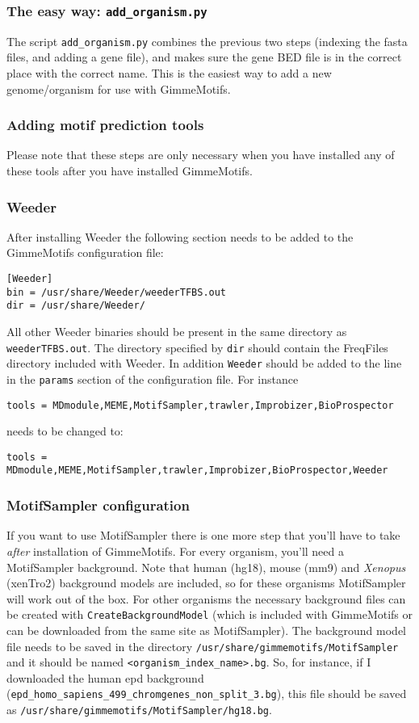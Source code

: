 \documentclass[11pt]{article}
\begin{document}
\subsubsection{The easy way: \texttt{add\_organism.py}}
The script \texttt{add\_organism.py} combines the previous two steps (indexing the fasta files, and adding a gene file), and makes sure the gene BED file is in the correct place with the correct name. This is the easiest way to add a new genome/organism for use with GimmeMotifs.

\subsubsection{Adding motif prediction tools} \label{sec:adding_tools}
Please note that these steps are only necessary when you have installed any of these tools after you have installed GimmeMotifs.

\subsubsection*{Weeder}
After installing Weeder the following section needs to be added to the GimmeMotifs configuration file:
\begin{verbatim}
[Weeder]
bin = /usr/share/Weeder/weederTFBS.out
dir = /usr/share/Weeder/ 
\end{verbatim}
All other Weeder binaries should be present in the same directory as \texttt{weederTFBS.out}. The directory specified by \texttt{dir} should contain the FreqFiles directory included with Weeder.
In addition \texttt{Weeder} should be added to the line in the \texttt{params} section of the configuration file. For instance 
\begin{verbatim}
tools = MDmodule,MEME,MotifSampler,trawler,Improbizer,BioProspector
\end{verbatim}
needs to be changed to:
\begin{verbatim}
tools = MDmodule,MEME,MotifSampler,trawler,Improbizer,BioProspector,Weeder
\end{verbatim}

\subsubsection{MotifSampler configuration}
\label{sec:MotifSampler}
If you want to use MotifSampler there is one more step that you'll have to take \emph{after} installation of GimmeMotifs. For every organism, you'll need a MotifSampler background. Note that human (hg18), mouse (mm9) and \textit{Xenopus} (xenTro2) background models are included, so for these organisms MotifSampler will work out of the box. For other organisms the necessary background files can be created with \texttt{CreateBackgroundModel} (which is included with GimmeMotifs or can be downloaded from the same site as MotifSampler). The background model file needs to be saved in the directory \texttt{/usr/share/gimmemotifs/MotifSampler} and it should be named \texttt{<organism\_index\_name>.bg}. So, for instance, if I downloaded the human epd background (\texttt{epd\_homo\_sapiens\_499\_chromgenes\_non\_split\_3.bg}), this file should be saved as \texttt{/usr/share/gimmemotifs/MotifSampler/hg18.bg}.
\end{document}
